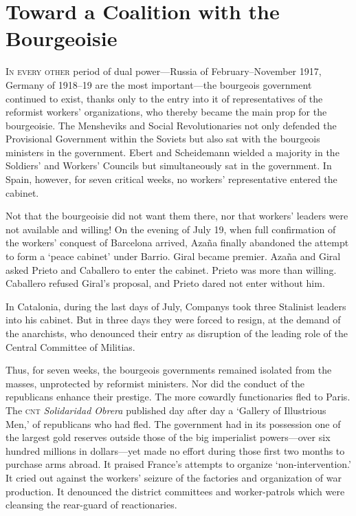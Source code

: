 \chapter{Toward a Coalition with the Bourgeoisie}

\textsc{In every other} period of dual power---Russia of February--No\-vem\-ber 1917, Germany of 1918--19 are the most important---the bourgeois government continued to exist, thanks only to the entry into it of representatives of the reformist workers’ organizations, who thereby became the main prop for the bourgeoisie. The Mensheviks and Social Revolutionaries not only defended the Provisional Government within the Soviets but also sat with the bourgeois ministers in the government. Ebert and Scheidemann wielded a majority in the Soldiers’ and Workers’ Councils but simultaneously sat in the government. In Spain, however, for seven critical weeks, no workers’ representative entered the cabinet.

Not that the bourgeoisie did not want them there, nor that workers’ leaders were not available and willing! On the evening of July 19, when full confirmation of the workers’ conquest of Barcelona arrived, Azaña finally abandoned the attempt to form a ‘peace cabinet’ under Barrio. Giral became premier. Azaña and Giral asked Prieto and Caballero to enter the cabinet. Prieto was more than willing. Caballero refused Giral’s proposal, and Prieto dared not enter without him.

In Catalonia, during the last days of July, Companys took three Stalinist leaders into his cabinet. But in three days they were forced to resign, at the demand of the anarchists, who denounced their entry as disruption of the leading role of the Central Committee of Militias.

Thus, for seven weeks, the bourgeois governments remained isolated from the masses, unprotected by reformist ministers. Nor did the conduct of the republicans enhance their prestige. The more cowardly functionaries fled to Paris. The \textsc{cnt} \emph{Solidaridad Obrera} published day after day a ‘Gallery of Illustrious Men,’ of republicans who had fled. The government had in its possession one of the largest gold reserves outside those of the big imperialist powers---over six hundred millions in dollars---yet made no effort during those first two months to purchase arms abroad. It praised France’s attempts to organize ‘non-intervention.’ It cried out against the workers’ seizure of the factories and organization of war production. It denounced the district committees and worker-patrols which were cleansing the rear-guard of reactionaries.

